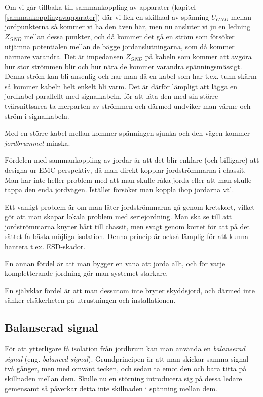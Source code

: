 Om vi går tillbaka till sammankoppling av apparater (kapitel
\ref{sammankopplingavapparater}) där vi fick en skillnad av spänning \(U_{GND}\)
mellan jordpunkterna så kommer vi ha den även här, men nu ansluter vi ju en
ledning \(Z_{GND}\) mellan dessa punkter, och då kommer det gå en ström som
försöker utjämna potentialen mellan de bägge jordanslutningarna, som då kommer
närmare varandra.
Det är impedansen \(Z_{GND}\) på kabeln som kommer att avgöra hur stor strömmen
blir och hur nära de kommer varandra spänningsmässigt.
Denna ström kan bli ansenlig och har man då en kabel som har t.ex. tunn skärm
så kommer kabeln helt enkelt bli varm.
Det är därför lämpligt att lägga en jordkabel parallellt med signalkabeln, för
att låta den med sin större tvärsnittsarea ta merparten av strömmen och därmed
undviker man värme och ström i signalkabeln.

Med en större kabel mellan kommer spänningen sjunka och den vägen kommer
\emph{jordbrummet} minska.

Fördelen med sammankoppling av jordar är att det blir enklare (och billigare)
att designa ur EMC-perspektiv, då man direkt kopplar jordströmmarna i chassit.
Man har inte heller problem med att man skulle råka jorda eller att man skulle
tappa den enda jordvägen.
Istället försöker man koppla ihop jordarna väl.

Ett vanligt problem är om man låter jordströmmarna gå genom kretskort, vilket
gör att man skapar lokala problem med seriejordning.
Man ska se till att jordströmmarna knyter hårt till chassit, men svagt genom
kortet för att på det sättet få bästa möjliga isolation.
Denna princip är också lämplig för att kunna hantera t.ex. ESD-skador.

En annan fördel är att man bygger en vana att jorda allt, och för varje
kompletterande jordning gör man systemet starkare.

En självklar fördel är att man dessutom inte bryter skyddsjord, och därmed inte
sänker elsäkerheten på utrustningen och installationen.

\subsection{Balanserad signal}

För att ytterligare få isolation från jordbrum kan man använda en
\emph{balanserad signal} (eng. \emph{balanced signal}).
Grundprincipen är att man skickar samma signal två gånger, men med omvänt
tecken, och sedan ta emot den och bara titta på skillnaden mellan dem.
Skulle nu en störning introducera sig på dessa ledare gemensamt så påverkar
detta inte skillnaden i spänning mellan dem.

